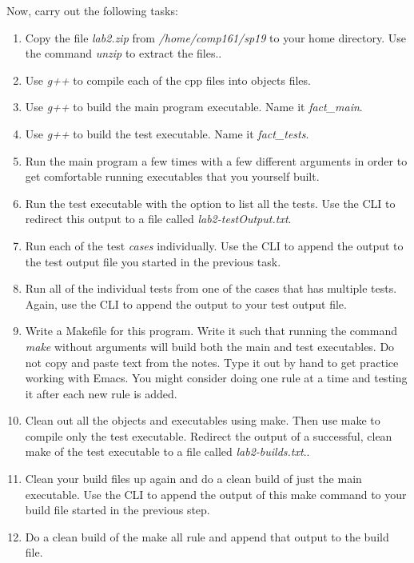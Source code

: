 \documentclass[nobib]{tufte-handout}
\begin{document}
Now, carry out the following tasks:
\begin{enumerate}
\item Copy the file \textit{lab2.zip} from \textit{/home/comp161/sp19} to your home directory. Use the command \textit{unzip} to extract the files..
\item Use \textit{g++} to compile each of the cpp files into objects files.
\item Use \textit{g++} to build the main program executable. Name it \textit{fact\_main}.
\item Use \textit{g++} to build the test executable. Name it \textit{fact\_tests}.
\item Run the main program a few times with a few different arguments in order to get comfortable running executables that you yourself built.
\item Run the test executable with the option to list all the tests. Use the CLI to redirect this output to a file called \textit{lab2-testOutput.txt}.
\item Run each of the test \textit{cases} individually. Use the CLI to append the output to the test output file you started in the previous task.
\item Run all of the individual tests from one of the cases that has multiple tests. Again, use the CLI to append the output to your test output file.
\item Write a Makefile for this program. Write it such that running the command \textit{make} without arguments will build both the main and test executables. Do not copy and paste text from the notes. Type it out by hand to get practice working with Emacs. You might consider doing one rule at a time and testing it after each new rule is added.
\item Clean out all the objects and executables using make. Then use make to compile only the test executable. Redirect the output of a successful, clean make of the test executable to a file called \textit{lab2-builds.txt}..
\item Clean your build files up again and do a clean build of just the main executable. Use the CLI to append the output of this make command to your build file started in the previous step.
\item Do a clean build of the make all rule and append that output to the build file.
\end{enumerate}
\end{document}
